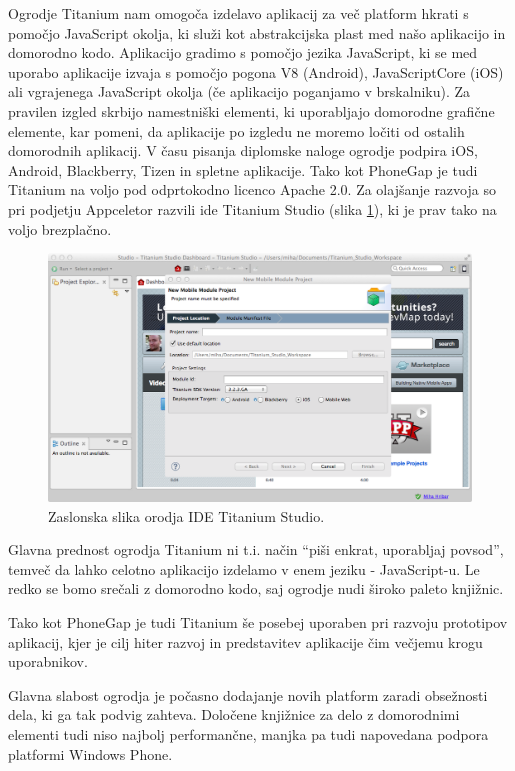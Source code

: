Ogrodje Titanium\cite{titanium} nam omogoča izdelavo aplikacij za več platform hkrati s pomočjo JavaScript okolja, ki služi kot abstrakcijska plast med našo aplikacijo in domorodno kodo. Aplikacijo gradimo s pomočjo jezika JavaScript, ki se med uporabo aplikacije izvaja s pomočjo pogona V8\cite{v8} (Android), JavaScriptCore (iOS)\cite{javascriptcore} ali vgrajenega JavaScript okolja (če aplikacijo poganjamo v brskalniku). Za pravilen izgled skrbijo namestniški elementi, ki uporabljajo domorodne grafične elemente, kar pomeni, da aplikacije po izgledu ne moremo ločiti od ostalih domorodnih aplikacij. V času pisanja diplomske naloge ogrodje podpira iOS, Android, Blackberry, Tizen in spletne aplikacije. Tako kot PhoneGap je tudi Titanium na voljo pod odprtokodno licenco Apache 2.0. Za olajšanje razvoja so pri podjetju Appceletor razvili \gls{ide} Titanium Studio (slika \ref{fig:titanium-studio}), ki je prav tako na voljo brezplačno.

\begin{figure}
 \includegraphics[width=\linewidth]{titanium}
 \caption{Zaslonska slika orodja IDE Titanium Studio.}
 \label{fig:titanium-studio}
\end{figure}

Glavna prednost ogrodja Titanium ni t.i. način ``piši enkrat, uporabljaj povsod'', temveč da lahko celotno aplikacijo izdelamo v enem jeziku - JavaScript-u. Le redko se bomo srečali z domorodno kodo, saj ogrodje nudi široko paleto knjižnic.

Tako kot PhoneGap je tudi Titanium še posebej uporaben pri razvoju prototipov aplikacij, kjer je cilj hiter razvoj in predstavitev aplikacije čim večjemu krogu uporabnikov.

Glavna slabost ogrodja je počasno dodajanje novih platform zaradi obsežnosti dela, ki ga tak podvig zahteva. Določene knjižnice za delo z domorodnimi elementi tudi niso najbolj performančne, manjka pa tudi napovedana podpora platformi Windows Phone.

